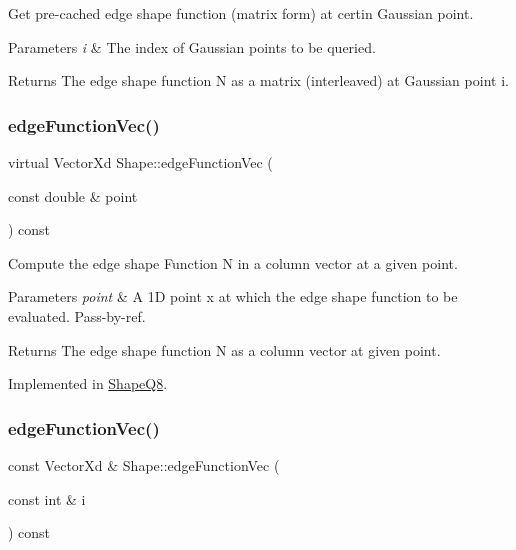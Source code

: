 Get pre-\/cached edge shape function (matrix form) at certin Gaussian point. 


\begin{DoxyParams}{Parameters}
{\em i} & The index of Gaussian points to be queried. \\
\hline
\end{DoxyParams}
\begin{DoxyReturn}{Returns}
The edge shape function N as a matrix (interleaved) at Gaussian point i. 
\end{DoxyReturn}
\mbox{\label{class_shape_aeb6b5b956ca89b571d17ee7e140bb689}} 
\subsubsection{\texorpdfstring{edge\+Function\+Vec()}{edgeFunctionVec()}\hspace{0.1cm}{\footnotesize\ttfamily [1/2]}}
{\footnotesize\ttfamily virtual Vector\+Xd Shape\+::edge\+Function\+Vec (\begin{DoxyParamCaption}\item[{const double \&}]{point }\end{DoxyParamCaption}) const\hspace{0.3cm}{\ttfamily [pure virtual]}}



Compute the edge shape Function N in a column vector at a given point. 


\begin{DoxyParams}{Parameters}
{\em point} & A 1D point x at which the edge shape function to be evaluated. Pass-\/by-\/ref. \\
\hline
\end{DoxyParams}
\begin{DoxyReturn}{Returns}
The edge shape function N as a column vector at given point. 
\end{DoxyReturn}


Implemented in \mbox{\hyperlink{class_shape_q8_a6d5e89cd06d6639e599215686553adbe}{Shape\+Q8}}.

\mbox{\label{class_shape_a1d79b0ac86d547e06121eec43cbdea2b}} 
\subsubsection{\texorpdfstring{edge\+Function\+Vec()}{edgeFunctionVec()}\hspace{0.1cm}{\footnotesize\ttfamily [2/2]}}
{\footnotesize\ttfamily const Vector\+Xd \& Shape\+::edge\+Function\+Vec (\begin{DoxyParamCaption}\item[{const int \&}]{i }\end{DoxyParamCaption}) const}



